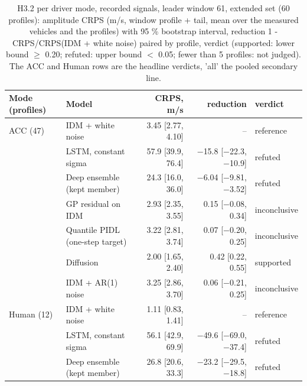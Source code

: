\begin{table}[htbp]
\centering
\small
\caption{H3.2 per driver mode, recorded signals, leader window 61, extended set (60 profiles): amplitude CRPS (m/s, window profile + tail, mean over the measured vehicles and the profiles) with 95 \% bootstrap interval, reduction 1 - CRPS/CRPS(IDM + white noise) paired by profile, verdict (supported: lower bound $\geq$ 0.20; refuted: upper bound $<$ 0.05; fewer than 5 profiles: not judged). The ACC and Human rows are the headline verdicts, 'all' the pooled secondary line.}
\label{tab:t5-h32--e3--raw-w61}
\begin{tabular}{llrrl}
\toprule
Mode (profiles) & Model & CRPS, m/s & reduction & verdict \\
\midrule
ACC (47) & IDM + white noise & 3.45 [2.77, 4.10] & -- & reference \\
 & LSTM, constant sigma & 57.9 [39.9, 76.4] & $-$15.8 [$-$22.3, $-$10.9] & refuted \\
 & Deep ensemble (kept member) & 24.3 [16.0, 36.0] & $-$6.04 [$-$9.81, $-$3.52] & refuted \\
 & GP residual on IDM & 2.93 [2.35, 3.55] & 0.15 [$-$0.08, 0.34] & inconclusive \\
 & Quantile PIDL (one-step target) & 3.22 [2.81, 3.74] & 0.07 [$-$0.20, 0.25] & inconclusive \\
 & Diffusion & 2.00 [1.65, 2.40] & 0.42 [0.22, 0.55] & supported \\
 & IDM + AR(1) noise & 3.25 [2.86, 3.70] & 0.06 [$-$0.21, 0.25] & inconclusive \\
\midrule
Human (12) & IDM + white noise & 1.11 [0.83, 1.41] & -- & reference \\
 & LSTM, constant sigma & 56.1 [42.9, 69.9] & $-$49.6 [$-$69.0, $-$37.4] & refuted \\
 & Deep ensemble (kept member) & 26.8 [20.6, 33.3] & $-$23.2 [$-$29.5, $-$18.8] & refuted \\

\end{tabular}
\end{table}
